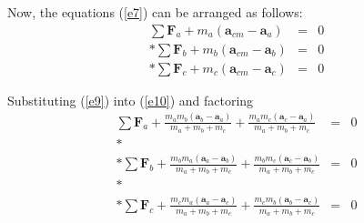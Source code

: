\documentclass[12pt]{article}
\newcommand{\yN}{\newpage}%
\newcommand{\vA}{\mathbf{a}}
\newcommand{\vF}{\mathbf{F}}
\newcommand{\mM}{m}
\newcommand{\ra}{_a}
\newcommand{\rb}{_b}
\newcommand{\rc}{_c}
\newcommand{\rcm}{_{cm}}
\begin{document}
\par Now, the equations (\ref{e7}) can be arranged as follows:
\begin{eqnarray}
\sum \vF\ra + \mM\ra(\vA\rcm - \vA\ra) & = & 0 \nonumber \\*
\sum \vF\rb + \mM\rb(\vA\rcm - \vA\rb) & = & 0 \label{e10} \\*
\sum \vF\rc + \mM\rc(\vA\rcm - \vA\rc) & = & 0 \nonumber
\end{eqnarray}
\par Substituting (\ref{e9}) into (\ref{e10}) and factoring
\begin{eqnarray}
\sum \vF\ra + \frac{\mM\ra\mM\rb(\vA\rb - \vA\ra)}{\mM\ra + \mM\rb + \mM\rc} + \frac{\mM\ra\mM\rc(\vA\rc - \vA\ra)}{\mM\ra + \mM\rb + \mM\rc} & = & 0 \nonumber \\* \nonumber \\*
\sum \vF\rb + \frac{\mM\rb\mM\ra(\vA\ra - \vA\rb)}{\mM\ra + \mM\rb + \mM\rc} + \frac{\mM\rb\mM\rc(\vA\rc - \vA\rb)}{\mM\ra + \mM\rb + \mM\rc} & = & 0 \label{e11} \\* \nonumber \\*
\sum \vF\rc + \frac{\mM\rc\mM\ra(\vA\ra - \vA\rc)}{\mM\ra + \mM\rb + \mM\rc} + \frac{\mM\rc\mM\rb(\vA\rb - \vA\rc)}{\mM\ra + \mM\rb + \mM\rc} & = & 0 \nonumber
\end{eqnarray}

\yN \baselineskip=15.4pt \enlargethispage{0em}
\end{document}
